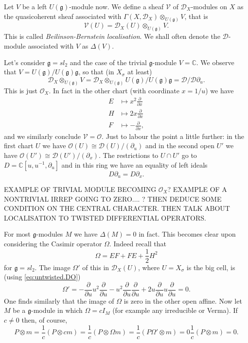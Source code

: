 \documentclass[12pt]{article}
\theoremstyle{plain}
\theoremstyle{definition}
\numberwithin{equation}{section}
\newcommand{\V}{\mathcal{V}}
\newcommand{\Om}{\Omega}
\newcommand{\D}{\Delta}
\newcommand{\C}{\mathbb{C}}
\newcommand{\g}{\mathfrak{g}}
\newcommand{\CD}{\mathcal{D}}
\newcommand{\CV}{\mathcal{V}}
\newcommand{\OO}{\mathcal{O}}
\begin{document}
Let $V$ be a left $U(\g)$-module now. We define a sheaf $\CV$ of $\CD_X$-modules on $X$ as the quasicoherent sheaf associated with $\Gamma(X, \CD_X) \otimes_{U(\g)} V$, that is
\[
\V(U) = \CD_X(U) \otimes_{U(\g)} V.
\]
This is called \emph{Beilinson-Bernstein localisation}. We shall often denote the $\CD$-module associated with $V$ as $\D(V)$.

Let's consider $\g = sl_2$ and the case of the trivial $\g$-module $V = \C$. We observe that $V = U(\g) / U(\g)\g$, so that (in $X_\sigma$ at least)
\[
\CD_X \otimes_{U(\g)} V = \CD_X \otimes_{U(\g)} U(\g) / U(\g) \g = \CD / \CD \partial_u.
\]
This is just $\OO_X$. In fact in the other chart (with coordinate $x = 1/u$) we have
\begin{align*}
E &\mapsto x^2 \frac{\partial}{\partial x} \\
%
H &\mapsto 2 x \frac{\partial}{\partial x} \\
%
F &\mapsto -\frac{\partial}{\partial x},
\end{align*}
and we similarly conclude $\CV = \OO$. Just to labour the point a little further: in the first chart $U$ we have $\OO(U) \cong \CD(U) / (\partial_u)$ and in the second open $U'$ we have $\OO(U') \cong \CD(U') / (\partial_x)$. The restrictions to $U \cap U'$ go to $D = \C[u, u^{-1}, \partial_u]$ and in this ring we have an equality of left ideals
\[
D \partial_u = D \partial_x.
\]




EXAMPLE OF TRIVIAL MODULE BECOMING $\OO_X$? EXAMPLE OF A NONTRIVIAL IRREP GOING TO ZERO.... ? THEN DEDUCE SOME CONDITION ON THE CENTRAL CHARACTER. THEN TALK ABOUT LOCALISATION TO TWISTED DIFFERENTIAL OPERATORS.






For most $\g$-modules $M$ we have $\D(M) = 0$ in fact. This becomes clear upon considering the Casimir operator $\Om$. Indeed recall that
\[
\Om = EF + FE + \frac{1}{2}H^2
\]
for $\g = sl_2$. The image $\Om'$ of this in $\CD_X(U)$, where $U = X_\sigma$ is the big cell, is (using \eqref{eq:untwisted.DO})
\[
\Om' = -\frac{\partial}{\partial u} u^2 \frac{\partial}{\partial u} - u^2 \frac{\partial}{\partial u} \frac{\partial}{\partial u} + 2 u \frac{\partial}{\partial u} u \frac{\partial}{\partial u} = 0.
\]
One finds similarly that the image of $\Om$ is zero in the other open affine. Now let $M$ be a $\g$-module in which $\Om = c I_M$ (for example any irreducible or Verma). If $c \neq 0$ then, of course,
\[
P \otimes m = \frac{1}{c} (P \otimes c m) = \frac{1}{c} (P \otimes \Om m) = \frac{1}{c} (P \Om' \otimes m) = 0 \frac{1}{c} (P \otimes m) = 0.
\]
\end{document}
